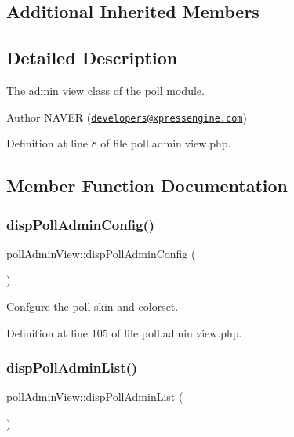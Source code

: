 \subsection*{Additional Inherited Members}


\subsection{Detailed Description}
The admin view class of the poll module. 

\begin{DoxyAuthor}{Author}
N\+A\+V\+ER (\href{mailto:developers@xpressengine.com}{\tt developers@xpressengine.\+com}) 
\end{DoxyAuthor}


Definition at line 8 of file poll.\+admin.\+view.\+php.



\subsection{Member Function Documentation}
\mbox{\label{classpollAdminView_a187abafd38bcaa2b0f72b4f08e667be8}} 
\subsubsection{\texorpdfstring{disp\+Poll\+Admin\+Config()}{dispPollAdminConfig()}}
{\footnotesize\ttfamily poll\+Admin\+View\+::disp\+Poll\+Admin\+Config (\begin{DoxyParamCaption}{ }\end{DoxyParamCaption})}



Confgure the poll skin and colorset. 



Definition at line 105 of file poll.\+admin.\+view.\+php.

\mbox{\label{classpollAdminView_a6c6fb22f667d20327d6770a3227c2875}} 
\subsubsection{\texorpdfstring{disp\+Poll\+Admin\+List()}{dispPollAdminList()}}
{\footnotesize\ttfamily poll\+Admin\+View\+::disp\+Poll\+Admin\+List (\begin{DoxyParamCaption}{ }\end{DoxyParamCaption})}



